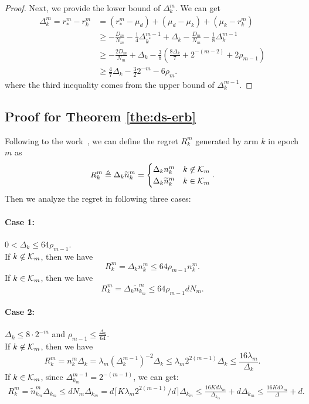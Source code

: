 \begin{proof}
    Next, we provide the lower bound of $\Delta_k^m$. We can get
    \begin{equation*}
    \begin{split}
        \Delta_k^m =  r_*^m - r_k^m
        &= (r_*^m - \mu_{d}) + (\mu_{d} - \mu_k) + (\mu_k - r_k^m) \\
        &\geq -\frac{D_m}{N_m} - \frac{1}{4}\Delta_{k^*}^{m-1} + \Delta_k -\frac{D_m}{N_m} - \frac{1}{8}\Delta_k^{m-1} \\
        &\geq -\frac{2D_m}{N_m} + \Delta_k - \frac{3}{8}\left(\frac{8 \Delta_k}{7} + 2^{-(m-2)} + 2\rho_{m-1}\right) \\
        &\geq \frac{4}{7}\Delta_k - \frac{3}{2}2^{-m} - 6\rho_m.
    \end{split}
    \end{equation*}
    where the third inequality comes from the upper bound of $\Delta_k^{m-1}$.
\end{proof}

\subsection{Proof for Theorem \ref{the:ds-erb}}

Following to the work~\cite{zimmert2019beating}, we can define the regret $R_k^m$ generated by arm $k$ in epoch $m$ as 
\[R_k^m\triangleq\Delta_k\widetilde{n}_{k}^m=\begin{cases}
    \Delta_kn_{k}^m & k\not\in {\mathcal{K}}_m\\
    \Delta_k\widetilde{n}_{k}^m & k \in {\mathcal{K}}_m
\end{cases}.\]
Then we analyze the regret in following three cases:

\paragraph{Case 1:} $0<\Delta_k\le 64\rho_{m-1}$.\\ 
If $k\not\in {\mathcal{K}}_m$, then we have \[R_k^m=\Delta_k n_{k}^m\le 64\rho_{m-1}n_k^m .\] 
If $k\in {\mathcal{K}}_m$, then we have \[R_k^m=\Delta_k\widetilde{n}_{k_m}^m\le 64\rho_{m-1}dN_m.\]

\paragraph{Case 2:} $\Delta_k \leq 8 \cdot 2^{-m}$ and $\rho_{m-1} \leq \frac{\Delta_k}{64}$.\\
If $k\not\in {\mathcal{K}}_m$, then we have \[R_k^m=n_{k}^m\Delta_k =\lambda_m(\Delta_k^{m-1})^{-2} \Delta_k \leq \lambda_m 2^{2(m-1)} \Delta_k  \leq \frac{16 \lambda_m}{\Delta_k}.\] 
If $k\in {\mathcal{K}}_m$, since $\Delta_{k_m}^{m-1} = 2^{-(m-1)}$, we can get:
\begin{align*}
    R_k^m=\widetilde{n}_{k_m}^m \Delta_{k_m} \leq 
    dN_m\Delta_{k_m} = d\lceil K\lambda_m 2^{2(m-1)} /d \rceil \Delta_{k_m} \leq \frac{16Kd\lambda_m}{\Delta_{k_m}} + d\Delta_{k_m} \leq \frac{16Kd\lambda_m}{\Delta} + d.
\end{align*}

